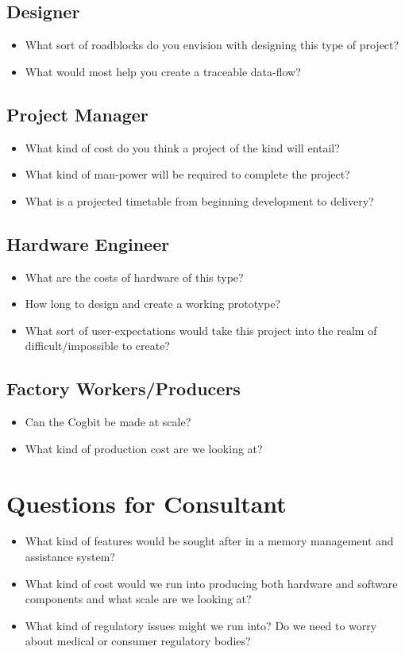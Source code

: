 \documentclass[12pt]{article}
\begin{document}
\subsection*{Designer}
\begin{itemize}
  \item What sort of roadblocks do you envision with designing this type of project?
  \item What would most help you create a traceable data-flow?
\end{itemize}

\subsection*{Project Manager}
\begin{itemize}
  \item What kind of cost do you think a project of the kind will entail?
  \item What kind of man-power will be required to complete the project?
  \item What is a projected timetable from beginning development to delivery?
\end{itemize}

\subsection*{Hardware Engineer}
\begin{itemize}
  \item What are the costs of hardware of this type?
  \item How long to design and create a working prototype?
  \item What sort of user-expectations would take this project into the realm of difficult/impossible to create?
\end{itemize}

\subsection*{Factory Workers/Producers}
\begin{itemize}
  \item Can the Cogbit be made at scale?
  \item What kind of production cost are we looking at?
\end{itemize}

\section*{Questions for Consultant}
\begin{itemize}
\item What kind of features would be sought after in a memory management and assistance system?
\item What kind of cost would we run into producing both hardware and software components and what scale are we looking at?
\item What kind of regulatory issues might we run into?  Do we need to worry about medical or consumer regulatory bodies?
\end{itemize}
\end{document}
